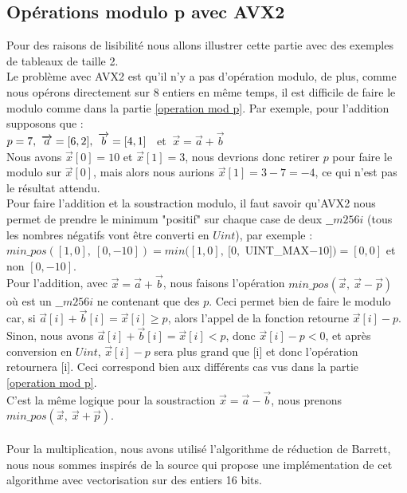 \documentclass[12pt, a4paper]{article}
\begin{document}
\subsection{Opérations modulo p avec AVX2}
\label{operation mod p AVX2}

Pour des raisons de lisibilité nous allons illustrer cette partie avec des exemples de tableaux de taille 2. \\
\indent Le problème avec AVX2 est qu'il n'y a pas d'opération modulo, de plus, comme nous opérons directement sur 8 entiers en même temps, il est difficile de faire le modulo comme dans la partie \ref{operation mod p}.
Par exemple, pour l'addition supposons que : \\
$p = 7, \ \overrightarrow{a} = [6, 2], \ \space \overrightarrow{b} = [4, 1]$ \ et $ \ \overrightarrow{x} = \overrightarrow{a}+\overrightarrow{b}$ \\
Nous avons $\overrightarrow{x}[0] = 10$ et $\overrightarrow{x}[1] = 3$, nous devrions donc retirer $p$ pour faire le modulo sur $\overrightarrow{x}[0]$, mais alors nous aurions $\overrightarrow{x}[1] = 3-7 = -4$, ce qui n'est pas le résultat attendu.\\ 
\indent Pour faire l'addition et la soustraction modulo, il faut savoir qu'AVX2 nous permet de prendre le minimum "positif" sur chaque case de deux $\_\_m256i$ (tous les nombres négatifs vont être converti en $Uint$), par exemple :\\ $min\_pos([1, 0],\  [0, -10]) = min([1, 0], \ [0,$ UINT\_MAX$-10]) = [0, 0]$ et non $[0, -10]$. \\
\indent Pour l'addition, avec $\overrightarrow{x} = \overrightarrow{a}+\overrightarrow{b}$, nous faisons l'opération $min\_pos(\overrightarrow{x},\ \overrightarrow{x}-\overrightarrow{p})$ où  est un $\_\_m256i$ ne contenant que des $p$. Ceci permet bien de faire le modulo car, si \linebreak $\overrightarrow{a}[i] + \overrightarrow{b}[i] = \overrightarrow{x}[i] \geq p$, alors l'appel de la fonction retourne $\overrightarrow{x}[i] - p$. Sinon, nous avons \linebreak $\overrightarrow{a}[i] + \overrightarrow{b}[i] = \overrightarrow{x}[i] < p$, donc $\overrightarrow{x}[i]-p < 0$, et après conversion en $Uint$, $\overrightarrow{x}[i]-p$ sera plus grand que [i] et donc l'opération retournera [i]. Ceci correspond bien aux différents cas vus dans la partie \ref{operation mod p}. \\
C'est la même logique pour la soustraction $\overrightarrow{x} = \overrightarrow{a}-\overrightarrow{b}$, nous prenons $min\_pos(\overrightarrow{x},\ \overrightarrow{x}+\overrightarrow{p})$. \\ \\
\indent Pour la multiplication, nous avons utilisé l'algorithme de réduction de Barrett, nous nous sommes inspirés de la source \cite{SIMD} qui propose une implémentation de cet algorithme avec vectorisation sur des entiers 16 bits.
\end{document}
